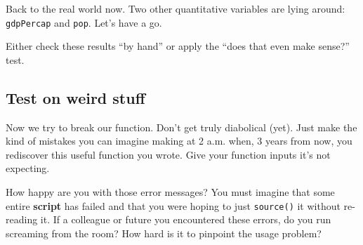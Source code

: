 \documentclass[
]{book}
\newenvironment{Shaded}{\begin{snugshade}}{\end{snugshade}}
\newcommand{\CommentTok}[1]{\textcolor[rgb]{0.56,0.35,0.01}{\textit{#1}}}
\newcommand{\KeywordTok}[1]{\textcolor[rgb]{0.13,0.29,0.53}{\textbf{#1}}}
\newcommand{\NormalTok}[1]{#1}
\newcommand{\OperatorTok}[1]{\textcolor[rgb]{0.81,0.36,0.00}{\textbf{#1}}}
\newcommand{\StringTok}[1]{\textcolor[rgb]{0.31,0.60,0.02}{#1}}
\begin{document}
Back to the real world now. Two other quantitative variables are lying around: \texttt{gdpPercap} and \texttt{pop}. Let's have a go.

\begin{Shaded}
\end{Shaded}

Either check these results ``by hand'' or apply the ``does that even make sense?'' test.

\hypertarget{test-on-weird-stuff}{%
\subsection{Test on weird stuff}\label{test-on-weird-stuff}}

Now we try to break our function. Don't get truly diabolical (yet). Just make the kind of mistakes you can imagine making at 2 a.m. when, 3 years from now, you rediscover this useful function you wrote. Give your function inputs it's not expecting.

\begin{Shaded}
\end{Shaded}

How happy are you with those error messages? You must imagine that some entire \textbf{script} has failed and that you were hoping to just \texttt{source()} it without re-reading it. If a colleague or future you encountered these errors, do you run screaming from the room? How hard is it to pinpoint the usage problem?
\end{document}

